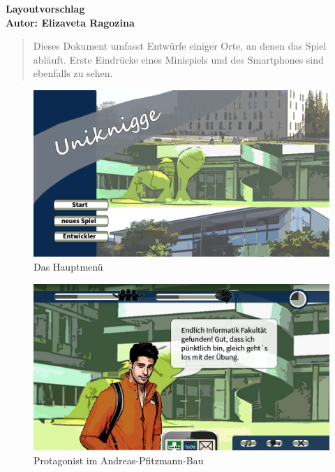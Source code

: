 \documentclass[a4paper,10pt]{article}
\begin{document}
\vspace*{1cm}

{\bfseries \large Layoutvorschlag \\[1mm]
\normalfont Autor: Elizaveta Ragozina}					%

\vspace{1cm}

\begin{abstract}
	Dieses Dokument umfasst Entwürfe einiger Orte, an denen das Spiel abläuft. Erste Eindrücke eines Minispiels und des Smartphones sind ebenfalls zu sehen.
\end{abstract}

\newpage

\begin{figure}
	\centering
	\includegraphics[width=\textwidth]{../layout/layout_mainmenu.png}
	\caption{Das Hauptmenü}
\end{figure}

\begin{figure}
	\centering
	\includegraphics[width=\textwidth]{../layout/layout_apb.png}
	\caption{Protagonist im Andreas-Pfitzmann-Bau}
\end{figure}
\end{document}
